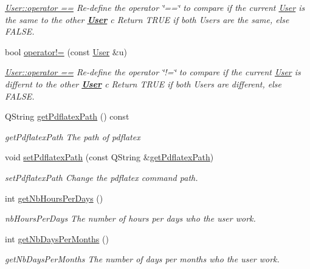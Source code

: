 \begin{DoxyCompactItemize}
\begin{DoxyCompactList}\small\item\em \hyperlink{classModels_1_1User_a60d18c2d1df053f1abf1215414f0b4b6}{User\+::operator ==} Re-\/define the operator \char`\"{}==\char`\"{} to compare if the current \hyperlink{classModels_1_1User}{User} is the same to the other {\bfseries \hyperlink{classModels_1_1User}{User}} {\itshape c} Return T\+R\+U\+E if both Users are the same, else F\+A\+L\+S\+E. \end{DoxyCompactList}\item 
bool \hyperlink{classModels_1_1User_aa1cdb1f752173aedd5f0c43edcb0b10b}{operator!=} (const \hyperlink{classModels_1_1User}{User} \&u)
\begin{DoxyCompactList}\small\item\em \hyperlink{classModels_1_1User_a60d18c2d1df053f1abf1215414f0b4b6}{User\+::operator ==} Re-\/define the operator \char`\"{}!=\char`\"{} to compare if the current \hyperlink{classModels_1_1User}{User} is differnt to the other {\bfseries \hyperlink{classModels_1_1User}{User}} {\itshape c} Return T\+R\+U\+E if both Users are different, else F\+A\+L\+S\+E. \end{DoxyCompactList}\item 
Q\+String \hyperlink{classModels_1_1User_ae8a894050c3e9266518707f6e5cd1c2f}{get\+Pdflatex\+Path} () const 
\begin{DoxyCompactList}\small\item\em get\+Pdflatex\+Path The path of pdflatex \end{DoxyCompactList}\item 
void \hyperlink{classModels_1_1User_ac65a44513c34f7e67888062d8bee3e54}{set\+Pdflatex\+Path} (const Q\+String \&\hyperlink{classModels_1_1User_ae8a894050c3e9266518707f6e5cd1c2f}{get\+Pdflatex\+Path})
\begin{DoxyCompactList}\small\item\em set\+Pdflatex\+Path Change the pdflatex command path. \end{DoxyCompactList}\item 
int \hyperlink{classModels_1_1User_acb46d721cae3c0a9059de32da0c33eaa}{get\+Nb\+Hours\+Per\+Days} ()
\begin{DoxyCompactList}\small\item\em nb\+Hours\+Per\+Days The number of hours per days who the user work. \end{DoxyCompactList}\item 
int \hyperlink{classModels_1_1User_a1ec672f16a5dbb248e05f2e957094c4d}{get\+Nb\+Days\+Per\+Months} ()
\begin{DoxyCompactList}\small\item\em get\+Nb\+Days\+Per\+Months The number of days per months who the user work. \end{DoxyCompactList}\end{DoxyCompactItemize}
